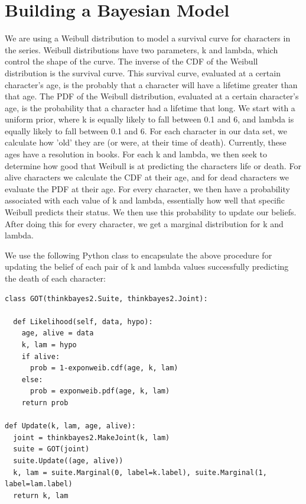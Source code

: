 \documentclass{article}
\begin{document}
\section{Building a Bayesian Model}
We are using a Weibull distribution to model a survival curve for characters in the series.  Weibull distributions have two parameters, k and lambda, which control the shape of the curve.  The inverse of the CDF of the Weibull distribution is the survival curve.  This survival curve, evaluated at a certain character's age, is the probably that a character will have a lifetime greater than that age.  The PDF of the Weibull distribution, evaluated at a certain character's age, is the probability that a character had a lifetime that long. We start with a uniform prior, where k is equally likely to fall between 0.1 and 6, and lambda is equally likely to fall between 0.1 and 6.  For each character in our data set, we calculate how 'old' they are (or were, at their time of death).  Currently, these ages have a resolution in books. For each k and lambda, we then seek to determine how good that Weibull is at predicting the characters life or death. For alive characters we calculate the CDF at their age, and for dead characters we evaluate the PDF at their age.  For every character, we then have a probability associated with each value of k and lambda, essentially how well that specific Weibull predicts their status.  We then use this probability to update our beliefs.  After doing this for every character, we get a marginal distribution for k and lambda.

We use the following Python class to encapsulate the above procedure for updating the belief of each pair of k and lambda values successfully predicting the death of each character:



\begin{lstlisting}
class GOT(thinkbayes2.Suite, thinkbayes2.Joint):

  def Likelihood(self, data, hypo):
    age, alive = data
    k, lam = hypo
    if alive:
      prob = 1-exponweib.cdf(age, k, lam)
    else:
      prob = exponweib.pdf(age, k, lam)
    return prob

def Update(k, lam, age, alive):
  joint = thinkbayes2.MakeJoint(k, lam)
  suite = GOT(joint)
  suite.Update((age, alive))
  k, lam = suite.Marginal(0, label=k.label), suite.Marginal(1, label=lam.label)
  return k, lam
\end{lstlisting}
\end{document}
